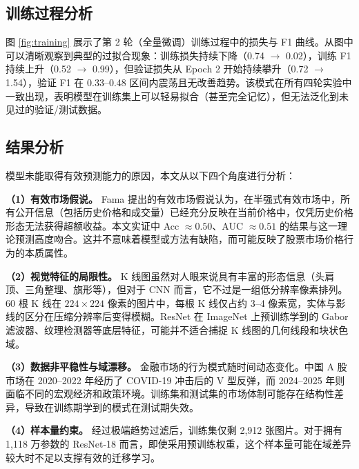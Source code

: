 \documentclass[12pt,a4paper]{ctexart}
\begin{document}
\subsection{训练过程分析}

图 \ref{fig:training} 展示了第 2 轮（全量微调）训练过程中的损失与 F1 曲线。从图中可以清晰观察到典型的过拟合现象：训练损失持续下降（0.74 $\to$ 0.02），训练 F1 持续上升（0.52 $\to$ 0.99），但验证损失从 Epoch 2 开始持续攀升（0.72 $\to$ 1.54），验证 F1 在 0.33--0.48 区间内震荡且无改善趋势。该模式在所有四轮实验中一致出现，表明模型在训练集上可以轻易拟合（甚至完全记忆），但无法泛化到未见过的验证/测试数据。


\subsection{结果分析}

模型未能取得有效预测能力的原因，本文从以下四个角度进行分析：

\textbf{（1）有效市场假说。} Fama\cite{fama1970} 提出的有效市场假说认为，在半强式有效市场中，所有公开信息（包括历史价格和成交量）已经充分反映在当前价格中，仅凭历史价格形态无法获得超额收益。本文实证中 Acc $\approx 0.50$、AUC $\approx 0.51$ 的结果与这一理论预测高度吻合。这并不意味着模型或方法有缺陷，而可能反映了股票市场价格行为的本质属性。

\textbf{（2）视觉特征的局限性。} K 线图虽然对人眼来说具有丰富的形态信息（头肩顶、三角整理、旗形等），但对于 CNN 而言，它不过是一组低分辨率像素排列。60 根 K 线在 $224 \times 224$ 像素的图片中，每根 K 线仅占约 3--4 像素宽，实体与影线的区分在压缩分辨率后变得模糊。ResNet 在 ImageNet 上预训练学到的 Gabor 滤波器、纹理检测器等底层特征，可能并不适合捕捉 K 线图的几何线段和块状色域。

\textbf{（3）数据非平稳性与域漂移。} 金融市场的行为模式随时间动态变化。中国 A 股市场在 2020--2022 年经历了 COVID-19 冲击后的 V 型反弹，而 2024--2025 年则面临不同的宏观经济和政策环境。训练集和测试集的市场体制可能存在结构性差异，导致在训练期学到的模式在测试期失效。

\textbf{（4）样本量约束。} 经过极端趋势过滤后，训练集仅剩 2,912 张图片。对于拥有 1,118 万参数的 ResNet-18 而言，即使采用预训练权重，这个样本量可能在域差异较大时不足以支撑有效的迁移学习。
\end{document}
